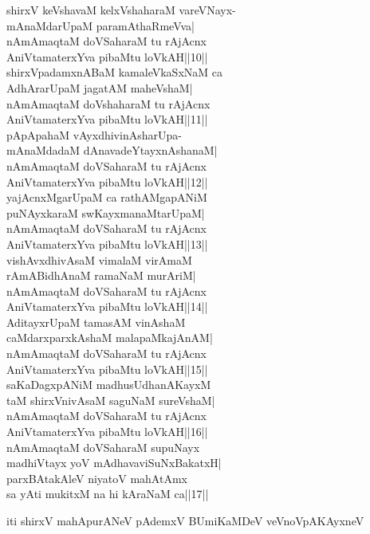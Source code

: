 \documentclass{article}
\begin{document}
shirxV keVshavaM kelxVshaharaM vareVNayx-\\
mAnaMdarUpaM paramAthaRmeVva|\\
nAmAmaqtaM doVSaharaM tu rAjAcnx\\
AniVtamaterxYva pibaMtu loVkAH||10||\\
shirxVpadamxnABaM kamaleVkaSxNaM ca\\
AdhArarUpaM jagatAM maheVshaM|\\
nAmAmaqtaM doVshaharaM tu rAjAcnx\\
AniVtamaterxYva pibaMtu loVkAH||11||\\
pApApahaM vAyxdhivinAsharUpa-\\
mAnaMdadaM dAnavadeYtayxnAshanaM|\\
nAmAmaqtaM doVSaharaM tu rAjAcnx\\
AniVtamaterxYva pibaMtu loVkAH||12||\\
yajAcnxMgarUpaM ca rathAMgapANiM\\
puNAyxkaraM swKayxmanaMtarUpaM|\\
nAmAmaqtaM doVSaharaM tu rAjAcnx\\
AniVtamaterxYva pibaMtu loVkAH||13||\\
vishAvxdhivAsaM vimalaM virAmaM\\
rAmABidhAnaM ramaNaM murAriM|\\
nAmAmaqtaM doVSaharaM tu rAjAcnx\\
AniVtamaterxYva pibaMtu loVkAH||14||\\
AditayxrUpaM tamasAM vinAshaM\\
caMdarxparxkAshaM malapaMkajAnAM|\\
nAmAmaqtaM doVSaharaM tu rAjAcnx\\
AniVtamaterxYva pibaMtu loVkAH||15||\\
saKaDagxpANiM madhusUdhanAKayxM\\
taM shirxVnivAsaM saguNaM sureVshaM|\\
nAmAmaqtaM doVSaharaM tu rAjAcnx\\
AniVtamaterxYva pibaMtu loVkAH||16||\\
nAmAmaqtaM doVSaharaM supuNayx\\
madhiVtayx yoV mAdhavaviSuNxBakatxH|\\
parxBAtakAleV niyatoV mahAtAmx\\
sa yAti mukitxM na hi kAraNaM ca||17||

\begin{center}
iti shirxV mahApurANeV pAdemxV BUmiKaMDeV veVnoVpAKAyxneV
\end{center}
\end{document}
